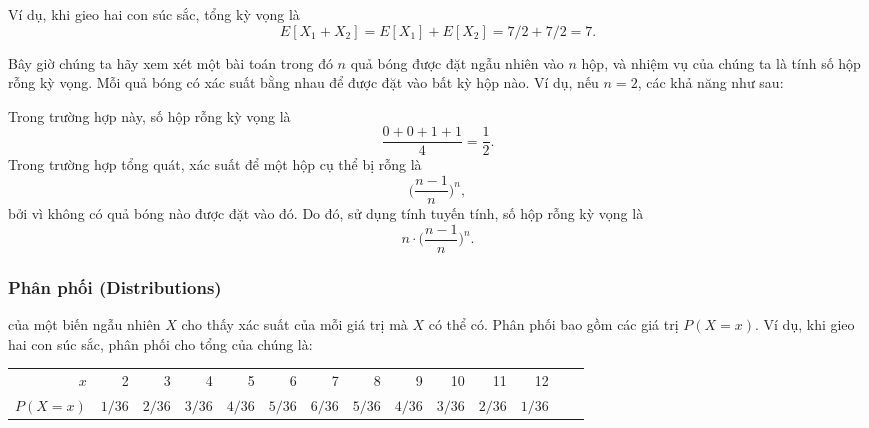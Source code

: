 Ví dụ, khi gieo hai con súc sắc,
tổng kỳ vọng là
\[E[X_1+X_2]=E[X_1]+E[X_2]=7/2+7/2=7.\]

Bây giờ chúng ta hãy xem xét một bài toán trong đó
$n$ quả bóng được đặt ngẫu nhiên vào $n$ hộp,
và nhiệm vụ của chúng ta là tính
số hộp rỗng kỳ vọng.
Mỗi quả bóng có xác suất bằng nhau để
được đặt vào bất kỳ hộp nào.
Ví dụ, nếu $n=2$, các khả năng
như sau:
\begin{center}
\end{center}
Trong trường hợp này, số hộp rỗng
kỳ vọng là
\[\frac{0+0+1+1}{4} = \frac{1}{2}.\]
Trong trường hợp tổng quát, xác suất để một
hộp cụ thể bị rỗng là
\[\Big(\frac{n-1}{n}\Big)^n,\]
bởi vì không có quả bóng nào được đặt vào đó.
Do đó, sử dụng tính tuyến tính, số hộp rỗng
kỳ vọng là
\[n \cdot \Big(\frac{n-1}{n}\Big)^n.\]

\subsubsection{Phân phối (Distributions)}


 của một biến ngẫu nhiên $X$
cho thấy xác suất của mỗi giá trị mà
$X$ có thể có.
Phân phối bao gồm các giá trị $P(X=x)$.
Ví dụ, khi gieo hai con súc sắc,
phân phối cho tổng của chúng là:
\begin{center}
\small {
\begin{tabular}{r|rrrrrrrrrrrrr}
$x$ & 2 & 3 & 4 & 5 & 6 & 7 & 8 & 9 & 10 & 11 & 12 \\
$P(X=x)$ & $1/36$ & $2/36$ & $3/36$ & $4/36$ & $5/36$ & $6/36$ & $5/36$ & $4/36$ & $3/36$ & $2/36$ & $1/36$ \\
\end{tabular}
}
\end{center}

